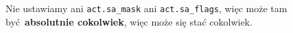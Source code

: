 Nie ustawiamy ani \texttt{act.sa\_mask} ani \texttt{act.sa\_flags}, więc może tam być \textbf{absolutnie cokolwiek}, więc może się stać cokolwiek.